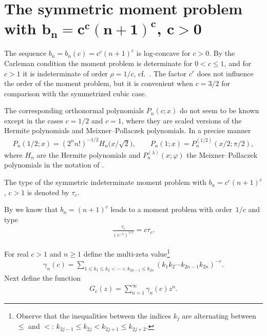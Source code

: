 \documentclass[pdftex]{sigma}
\numberwithin{equation}{section}
\begin{document}
\section[The symmetric moment problem with $b_n=c^c(n+1)^c$, $c>0$]{The symmetric moment problem with $\boldsymbol{b_n=c^c(n+1)^c}$, $\boldsymbol{c>0}$}\label{section7}

The sequence $b_n=b_n(c)=c^c(n+1)^c$ is log-concave for $c>0$. By the Carleman condition the moment problem is determinate for $0<c\le 1$, and for $c>1$ it is indeterminate of order $\rho=1/c$, cf.~\cite[Theorem~4.11]{B:S2}. The factor $c^c$ does not influence the order of the moment problem, but it is convenient when $c=3/2$ for comparison with the symmetrized cubic case.

The corresponding orthonormal polynomials $P_n(c;x)$ do not seem to be known except in the cases $c=1/2$ and $c=1$, where they are scaled versions of the Hermite polynomials and Meixner--Pollaczek polynomials. In a precise manner
\begin{gather*}
P_n(1/2;x)=(2^nn!)^{-1/2}H_n\big(x/\sqrt{2}\big),\qquad P_n(1;x)=P_n^{(1/2)}(x/2;\pi/2),
\end{gather*}
where $H_n$ are the Hermite polynomials and $P_n^{(\lambda)}(x;\varphi)$ the Meixner--Pollaczek polynomials in the notation of \cite{K:S}.


\begin{defn}\label{thm:type-c} The type of the symmetric indeterminate moment problem with $b_n=c^c(n+1)^c$, $c>1$ is denoted by $\tau_c$.
\end{defn}

By \cite[Proposition~2.3]{B:S3} we know that $b_n=(n+1)^c$ leads to a moment problem with order~$1/c$ and type
\begin{gather*}
\frac{\tau_c}{(c^{-c})^{1/c}}=c\tau_c.
\end{gather*}

For real $c>1$ and $n\ge 1$ define the multi-zeta value\footnote{Observe that the inequalities between the indices $k_j$ are alternating between $\le$ and $<$: $k_{2j-1}\le k_{2j}<k_{2j+1}\le k_{2j+2}$.}
\begin{gather*}%
\gamma_n(c)=\sum_{1\le k_1\le k_2<\cdots<k_{2n-1}\le k_{2n}}\left(k_1k_2\cdots k_{2n-1}k_{2n}\right)^{-c}.
\end{gather*}
Next define the function
\begin{gather*}
G_c(z)=\sum_{n=1}^\infty \gamma_n(c) z^n.
\end{gather*}
\end{document}
